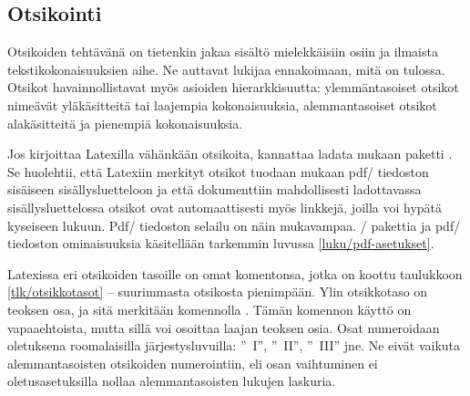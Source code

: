 \subsection{Otsikointi}
\label{luku/otsikot}

Otsikoiden tehtävänä on tietenkin jakaa sisältö mielekkäisiin osiin ja
ilmaista tekstikokonaisuuksien aihe. Ne auttavat lukijaa ennakoimaan,
mitä on tulossa. Otsikot havainnollistavat myös asioiden
hierarkkisuutta: ylemmäntasoiset otsikot nimeävät yläkäsitteitä tai
laajempia kokonaisuuksia, alemmantasoiset otsikot alakäsitteitä ja
pienempiä kokonaisuuksia.

Jos kirjoittaa Latexilla vähänkään otsikoita, kannattaa ladata mukaan
paketti . Se huolehtii, että Latexiin merkityt otsikot
tuodaan mukaan pdf\-/ tiedoston sisäiseen sisällysluetteloon ja että
dokumenttiin mahdollisesti ladottavassa sisällysluettelossa otsikot ovat
automaattisesti myös linkkejä, joilla voi hypätä kyseiseen lukuun.
Pdf\-/ tiedoston selailu on näin mukavampaa. \-/
pakettia ja pdf\-/ tiedoston ominaisuuksia käsitellään tarkemmin luvussa
\ref{luku/pdf-asetukset}.


Latexissa eri otsikoiden tasoille on omat komentonsa, jotka on koottu
taulukkoon \ref{tlk/otsikkotasot} -- suurimmasta otsikosta pienimpään.
Ylin otsikkotaso on teoksen osa, ja sitä merkitään komennolla
. Tämän komennon käyttö on vapaaehtoista, mutta sillä voi
osoittaa laajan teoksen osia. Osat numeroidaan oletuksena roomalaisilla
järjestysluvuilla: ''\partname~I'', ''\partname~II'', ''\partname~III''
jne. Ne eivät vaikuta alemmantasoisten otsikoiden numerointiin, eli osan
vaihtuminen ei oletusasetuksilla nollaa alemmantasoisten lukujen
laskuria.

